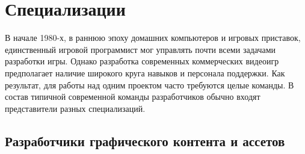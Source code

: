 \chapter{Специализации}

В начале 1980-х, в раннюю эпоху домашних компьютеров и игровых приставок, единственный игровой программист 
мог управлять почти всеми задачами разработки игры. Однако разработка современных коммерческих видеоигр 
предполагает наличие широкого круга навыков и персонала поддержки. Как результат, для работы над одним 
проектом часто требуются целые команды. В состав типичной современной команды разработчиков обычно входят 
представители разных специализаций.

\section{Разработчики графического контента и ассетов}
